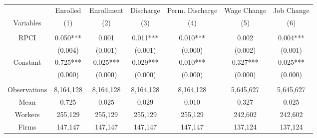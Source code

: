 \begin{tabular}{c|cccccc}
\toprule
\toprule
      & Enrolled & Enrollment & Discharge & Perm. Discharge & Wage Change & Job Change \\
Variables & (1) & (2) & (3) & (4) & (5) & (6) \\
\midrule
      &       &       &       &       &       &  \\
RPCI  & 0.050*** & 0.001 & 0.011*** & 0.010*** & 0.002 & 0.004*** \\
      & (0.004) & (0.001) & (0.001) & (0.000) & (0.002) & (0.001) \\
Constant & 0.725*** & 0.025*** & 0.029*** & 0.010*** & 0.327*** & 0.025*** \\
      & (0.000) & (0.000) & (0.000) & (0.000) & (0.000) & (0.000) \\
      &       &       &       &       &       &  \\
\midrule
Observations & 8,164,128 & 8,164,128 & 8,164,128 & 8,164,128 & 5,645,627 & 5,645,627 \\
Mean  & 0.725 & 0.025 & 0.029 & 0.010 & 0.327 & 0.025 \\
Workers & 255,129 & 255,129 & 255,129 & 255,129 & 242,602 & 242,602 \\
Firms & 147,147 & 147,147 & 147,147 & 147,147 & 137,124 & 137,124 \\
\bottomrule
\bottomrule
\end{tabular}%
